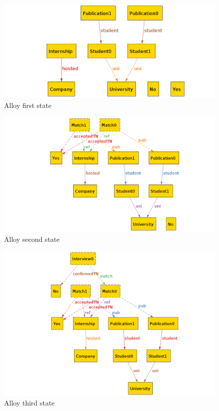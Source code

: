 \documentclass{article}
\begin{document}
\begin{figure}[H]
    \centering
    \includegraphics[width=1\linewidth]{alloy/state1.png}
    \caption{Alloy first state}
    \label{fig:state1}
\end{figure}


\begin{figure}[H]
    \centering
    \includegraphics[width=1\linewidth]{alloy/state2.png}
    \caption{Alloy second state}
    \label{fig:state2}
\end{figure}


\begin{figure}[H]
    \centering
    \includegraphics[width=1\linewidth]{alloy/state3.png}
    \caption{Alloy third state}
    \label{fig:state3}
\end{figure}
\end{document}

